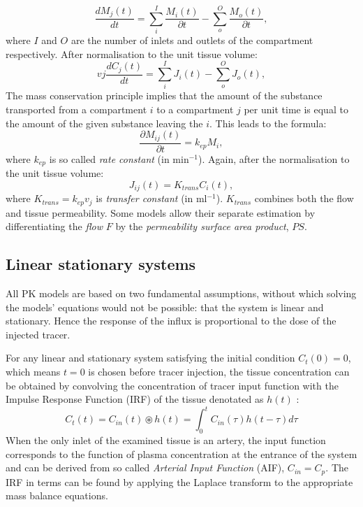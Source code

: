 \begin{equation}
\frac{dM_j(t)}{dt} = \sum_{i}^{I}\frac{M_i(t)}{\partial t}-\sum_{o}^{O}\frac{M_o(t)}{\partial t} ,
\label{eq:pk4}
\end{equation}
where $I$ and $O$ are the number of inlets and outlets of the compartment respectively. 
After normalisation to the unit tissue volume:
\begin{equation}
vj\frac{dC_j(t)}{dt} = \sum_{i}^{I}J_i(t)-\sum_{o}^{O}J_o(t) ,
\label{eq:pk5}
\end{equation}
The mass conservation principle implies that the amount of the substance transported from a compartment $i$ to a compartment $j$ per unit time is equal to the amount of the given substance leaving the $i$. This leads to the formula:
\begin{equation}
\frac{\partial M_{ij}(t)}{\partial t} = k_{ep}M_i,
\label{eq:pk6}
\end{equation}
where $k_{ep}$ is so called \textit{rate constant} (in min$^{-1}$). Again, after the normalisation to the unit tissue volume:
\begin{equation}
J_{ij}(t) = K_{trans}C_i(t),
\label{eq:pk7}
\end{equation}
where $K_{trans}=k_{ep}v_j$ is \textit{transfer constant} (in ml$^{-1}$). $K_{trans}$ combines both the flow and tissue permeability. Some models allow their separate estimation by differentiating the \textit{flow} $F$ by the \textit{permeability surface area product}, $PS$. 

\subsection{Linear stationary systems}
All PK models are based on two fundamental assumptions, without which solving the models' equations would not be possible: that the system is linear and stationary. Hence the response of the influx is proportional to the dose of the injected tracer.  

For any linear and stationary system satisfying the 
initial condition $C_t(0) = 0$, which means $t = 0$ is chosen before tracer injection,
the tissue concentration can be obtained by convolving the concentration of tracer input function with the Impulse Response Function (IRF) of the tissue denotated as $h(t)$ \cite{sourbron2011scope}: 
\begin{equation}
	\label{eq:convolution}
	C_{t}(t) = C_{in}(t)\circledast h(t) = \int_{0}^{t}C_{in}(\tau)h(t-\tau)d\tau 
\end{equation}
When the only inlet of the examined tissue is an artery, the input function corresponds to the function of plasma concentration at the entrance of the system and can be derived from so called \textit{Arterial Input Function} (AIF), $C_{in} = C_{p}$. The IRF in terms can be found by applying the Laplace transform to the appropriate mass balance equations.

